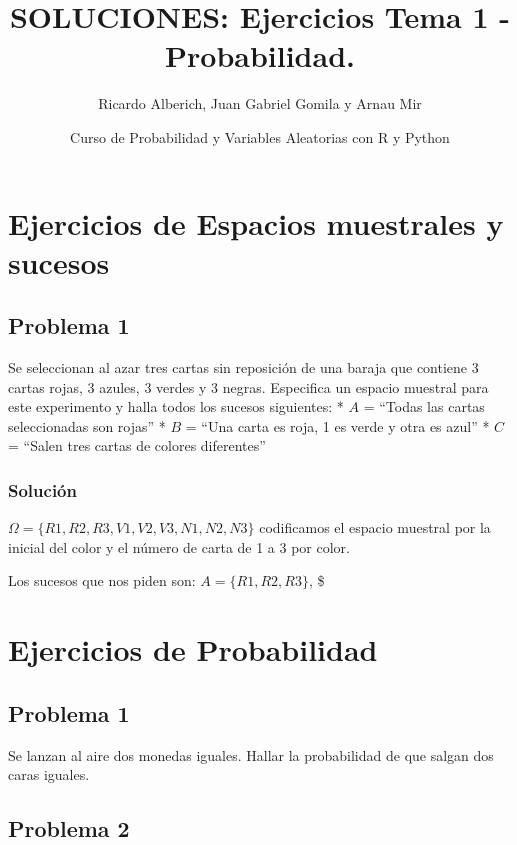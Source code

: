 \documentclass[
]{article}
\title{SOLUCIONES: Ejercicios Tema 1 - Probabilidad.}
\author{Ricardo Alberich, Juan Gabriel Gomila y Arnau Mir}
\date{Curso de Probabilidad y Variables Aleatorias con R y Python}
\begin{document}
\maketitle

\hypertarget{ejercicios-de-espacios-muestrales-y-sucesos}{%
\section{Ejercicios de Espacios muestrales y
sucesos}\label{ejercicios-de-espacios-muestrales-y-sucesos}}

\hypertarget{problema-1}{%
\subsection{Problema 1}\label{problema-1}}

Se seleccionan al azar tres cartas sin reposición de una baraja que
contiene 3 cartas rojas, 3 azules, 3 verdes y 3 negras. Especifica un
espacio muestral para este experimento y halla todos los sucesos
siguientes: * \(A\) = ``Todas las cartas seleccionadas son rojas'' *
\(B\) = ``Una carta es roja, 1 es verde y otra es azul'' * \(C\) =
``Salen tres cartas de colores diferentes''

\hypertarget{soluciuxf3n}{%
\subsubsection{Solución}\label{soluciuxf3n}}

\(\Omega=\{R1, R2, R3, V1, V2, V3, N1, N2, N3 \}\) codificamos el
espacio muestral por la inicial del color y el número de carta de 1 a 3
por color.

Los sucesos que nos piden son: \(A=\{R1, R2, R3\}\), \$

\hypertarget{ejercicios-de-probabilidad}{%
\section{Ejercicios de Probabilidad}\label{ejercicios-de-probabilidad}}

\hypertarget{problema-1-1}{%
\subsection{Problema 1}\label{problema-1-1}}

Se lanzan al aire dos monedas iguales. Hallar la probabilidad de que
salgan dos caras iguales.

\hypertarget{problema-2}{%
\subsection{Problema 2}\label{problema-2}}
\end{document}
